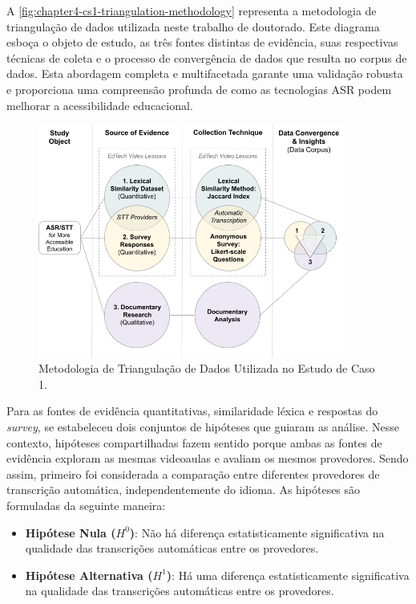 A \autoref{fig:chapter4-cs1-triangulation-methodology} representa a metodologia de triangulação de dados utilizada neste trabalho de doutorado. Este diagrama esboça o objeto de estudo, as três fontes distintas de evidência, suas respectivas técnicas de coleta e o processo de convergência de dados que resulta no corpus de dados. Esta abordagem completa e multifacetada garante uma validação robusta e proporciona uma compreensão profunda de como as tecnologias ASR podem melhorar a acessibilidade educacional.

\begin{figure}[htb]
\centering
\caption{Metodologia de Triangulação de Dados Utilizada no Estudo de Caso 1.}
\label{fig:chapter4-cs1-triangulation-methodology}
\includegraphics[width=0.9\textwidth]{images/chapter4-cs1-triangulation-methodology.png}
\end{figure}

Para as fontes de evidência quantitativas, similaridade léxica e respostas do \textit{survey}, se estabeleceu dois conjuntos de hipóteses que guiaram as análise. Nesse contexto, hipóteses compartilhadas fazem sentido porque ambas as fontes de evidência exploram as mesmas videoaulas e avaliam os mesmos provedores. Sendo assim, primeiro foi considerada a comparação entre diferentes provedores de transcrição automática, independentemente do idioma. As hipóteses são formuladas da seguinte maneira:

\begin{itemize}
\item \textbf{Hipótese Nula ($H^0$)}: Não há diferença estatisticamente significativa na qualidade das transcrições automáticas entre os provedores.
\item \textbf{Hipótese Alternativa ($H^1$)}: Há uma diferença estatisticamente significativa na qualidade das transcrições automáticas entre os provedores.
\end{itemize}

